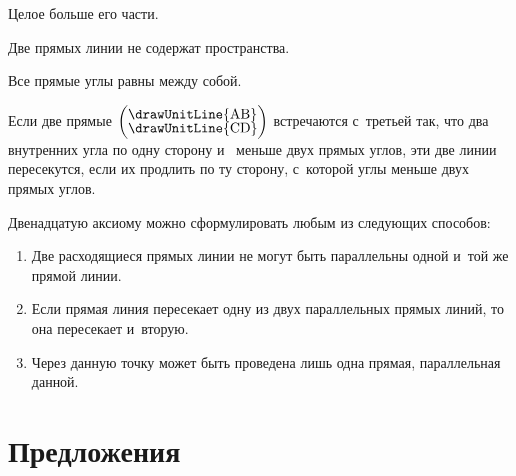 \documentclass[letters]{byrne-book}
\begin{document}
\startaxiom{}\label{ax:I.IX}
\begin{center}
Целое больше его части.
\end{center}

\startaxiom{}\label{ax:I.X}
\begin{center}
Две прямых линии не содержат пространства.
\end{center}

\startaxiom{}\label{ax:I.XI}
\begin{center}
Все прямые углы равны между собой.
\end{center}

\startaxiom{}\label{ax:I.XII}
\drawCurrentPictureInMargin
Если две прямые $\left(\vcenter{\nointerlineskip\hbox{\drawUnitLine{AB}}\nointerlineskip\hbox{\drawUnitLine{CD}}}\right)$ встречаются с~третьей  так, что два внутренних угла по одну сторону  и~ меньше двух прямых углов, эти две линии пересекутся, если их продлить по ту сторону, с~которой углы меньше двух прямых углов.

Двенадцатую аксиому можно сформулировать любым из следующих способов:
\begin{enumerate}
\item Две расходящиеся прямых линии не могут быть параллельны одной и~той же прямой линии.
\item Если прямая линия пересекает одну из двух параллельных прямых линий, то она пересекает и~вторую.
\item Через данную точку может быть проведена лишь одна прямая, параллельная данной.
\end{enumerate}

\chapter*{Предложения}
\end{document}
